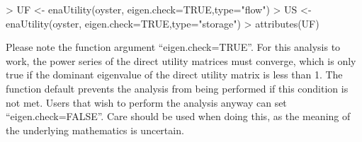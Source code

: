 \documentclass[article]{jss}
\begin{document}
\begin{Schunk}
\begin{Sinput}
> UF <- enaUtility(oyster, eigen.check=TRUE,type="flow")
> US <- enaUtility(oyster, eigen.check=TRUE,type="storage")
> attributes(UF)
\end{Sinput}
\end{Schunk}

Please note the function argument ``eigen.check=TRUE''.  For this
analysis to work, the power series of the direct utility matrices must
converge, which is only true if the dominant eigenvalue of the direct
utility matrix is less than 1. The function default prevents the
analysis from being performed if this condition is not met. Users that
wish to perform the analysis anyway can set ``eigen.check=FALSE''.  Care
should be used when doing this, as the meaning of the underlying
mathematics is uncertain.
\end{document}

